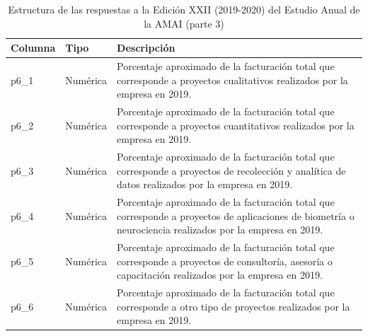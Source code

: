 
\begin{table}[]
\caption{Estructura de las respuestas a la Edición XXII (2019-2020) del Estudio Anual de la AMAI (parte 3)}
\label{tab:raw2019_3}
\begin{tabular}{|l|l|l|}
\hline
Columna & Tipo    & Descripción                                                                                                                \\ \hline
p6\_1   & Numérica & \parbox[t]{8cm}{Porcentaje aproximado de la facturación total que corresponde a proyectos cualitativos realizados por la empresa en 2019. \vspace{0.1cm}}  \\ \hline
p6\_2   & Numérica & \parbox[t]{8cm}{Porcentaje aproximado de la facturación total que corresponde a proyectos cuantitativos realizados por la empresa en 2019. \vspace{0.1cm}} \\ \hline
p6\_3 & Numérica & \parbox[t]{8cm}{Porcentaje aproximado de la facturación total que corresponde a proyectos de recolección y analítica de datos realizados por la empresa en 2019. \vspace{0.1cm}}       \\ \hline
p6\_4 & Numérica & \parbox[t]{8cm}{Porcentaje aproximado de la facturación total que corresponde a proyectos de aplicaciones de biometría o neurociencia realizados por la empresa en 2019. \vspace{0.1cm}} \\ \hline
p6\_5 & Numérica & \parbox[t]{8cm}{Porcentaje aproximado de la facturación total que corresponde a proyectos de consultoría, asesoría o capacitación realizados por la empresa en 2019. \vspace{0.1cm}}     \\ \hline
p6\_6   & Numérica & \parbox[t]{8cm}{Porcentaje aproximado de la facturación total que corresponde a otro tipo de proyectos realizados por la empresa en 2019. \vspace{0.1cm}}  \\ \hline
\end{tabular}
\end{table}


